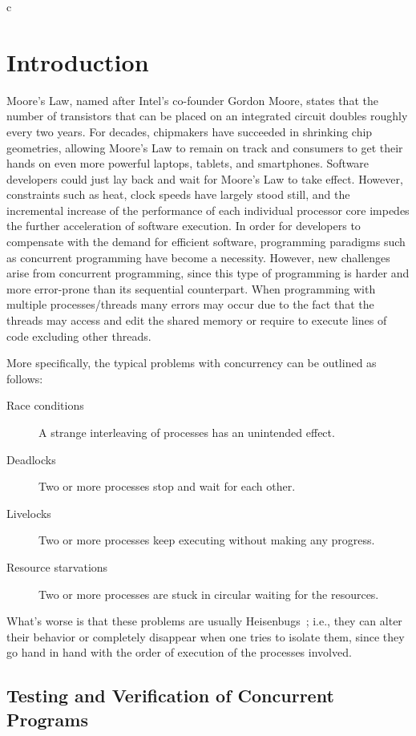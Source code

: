  c\chapter{Introduction}

Moore's Law, named after Intel's co-founder Gordon Moore, states that the number of transistors that can be placed on an integrated circuit doubles
roughly every two years. For decades, chipmakers have succeeded in shrinking chip geometries, allowing Moore's Law to remain on track and consumers to
get their hands on even more powerful laptops, tablets, and smartphones. Software developers could just lay back and wait for Moore's Law to take effect.
However, constraints such as heat, clock speeds have largely stood still, and the incremental increase of the performance of each individual 
processor core impedes the further acceleration of software execution. In order for developers to compensate with the demand for efficient software, programming paradigms such
as concurrent programming have become a necessity. However, new challenges arise from concurrent programming, since this type of programming is harder and more
error-prone than its sequential counterpart. When programming with multiple processes/threads many errors may occur due to the fact that the threads
may access and edit the shared memory or require to execute lines of code excluding other threads.

More specifically, the typical problems with concurrency can be outlined as follows:
\begin{description}
\item[Race conditions] A strange interleaving of processes has an unintended effect.
\item[Deadlocks] Two or more processes stop and wait for each other.
\item[Livelocks] Two or more processes keep executing without making any progress.
\item[Resource starvations] Two or more processes are stuck in circular waiting for the resources.
\end{description}
What's worse is that these problems are usually Heisenbugs~\cite{Musu08}; i.e., they can alter their behavior or completely
disappear when one tries to isolate them, since they go hand in hand with the order of
execution of the processes involved.

\section{Testing and Verification of Concurrent Programs}

